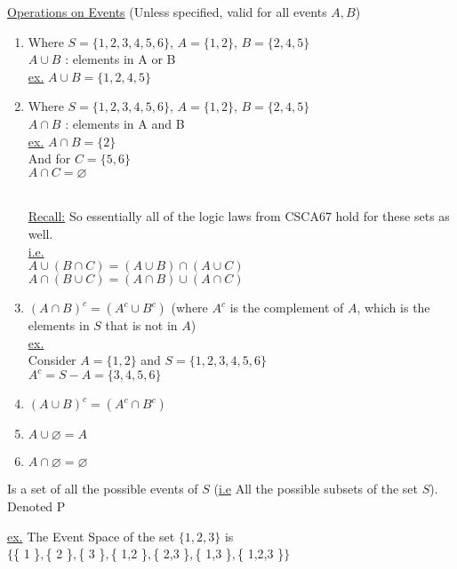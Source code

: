 \documentclass[12pt, twoside]{article}
\begin{document}
	\underline{Operations on Events} (Unless specified, valid for all events $A,B$)
	\begin{enumerate}
		\item{
		Where $S = \{ 1,2,3,4,5,6 \}$, $A =  \{ 1,2 \}$, $B = \{ 2,4,5 \}$\\
		$A \cup B$ : elements in A or B\\
		\underline{ex.}
		$A \cup B = \{ 1,2,4,5 \}$
		}
		\item{
		Where $S = \{ 1,2,3,4,5,6 \}$, $A =  \{ 1,2 \}$, $B = \{ 2,4,5 \}$\\
		$A \cap B$ : elements in A and B\\
		\underline{ex.} $A \cap B = \{ 2 \}$\\
		And for $C = \{ 5,6 \}$\\
		$A \cap C = \varnothing$\\
		\\
		\begin{tcolorbox}
		\underline{Recall:} So essentially all of the logic laws from CSCA67 hold for these sets as well.\\
		\underline{i.e.}\\
		$A \cup (B \cap C) = (A \cup B) \cap (A \cup C)$\\
		$A \cap (B \cup C) = (A \cap B) \cup (A \cap C)$
		\end{tcolorbox}
		}
		\item{
		$(A \cap B)^c = (A^c \cup B^c)$ (where $A^c$ is the complement of $A$, which is the elements in $S$ that is not in $A$)\\
		\underline{ex.}\\
		Consider $A = \{ 1,2 \}$ and $S = \{ 1,2,3,4,5,6 \}$\\
		$A^c = S - A = \{ 3,4,5,6 \}$
		}
		\item{
		$(A \cup B)^c = (A^c \cap B^c)$
		}
		\item{
		$A \cup \varnothing = A$
		}
		\item{
		$A \cap \varnothing = \varnothing$
		}
	\end{enumerate}


	\begin{tcolorbox}[title=Event Space] Is a set of all the possible events of $S$ (\underline{i.e} All the possible subsets of the set $S$). Denoted P
	\end{tcolorbox}
	\underline{ex.}
	The Event Space of the set $\{ 1,2,3 \}$ is\\
	$\{ $\{ 1 \}$,$\{ 2 \}$,$\{ 3 \}$, $\{ 1,2 \}$, $\{ 2,3 \}$, $\{ 1,3 \}$, $\{ 1,2,3 \}$ \}$
\end{document}
